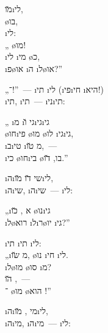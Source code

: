  \u{מו}\i{לי},\\
 \o{בו},\\
  \i{לי}:\\
„ \o{מו}!\\
  \i{לי} \i{מי}  \o{כ},\\
  \i{פ}\o{או} \i{ה} \i{ל}\o{או}?”

„־!”~— \i{תי} \i{לי} (\i{פי}\i{חי} \i{היא}!)\\
\i{תי}, \i{תי}~—  \i{ני}\i{תי}:

„  \i{מ} \i{גי} \u{ו}\i{גי}\i{גי}\\
\o{חו}\i{פי} \o{מו} \o{לו} \i{גי}\i{גי},\\
 \i{ב}\i{טי}  \i{מ} \u{טו},~—\\
\i{כי}  \o{חו}\i{בי} \o{בו}, \u{דו}.”

 \i{ה}\i{שי} \u{דו} \u{מו}\i{לי},\\
\i{ה}\i{שי}, \i{ה}\i{שי}~—   \i{לי}:

„\i{א} ,   \u{כו} \o{נו}\i{גי}\\
\i{ל}\o{רוא} \i{ל}\i{ר}\o{יו}  \i{גי}?”

\i{תי}  \i{תי} \i{לי}:\\
„\i{מ}  \u{שו}, \o{נו} \i{חי} \i{לי}.\\
   \i{ל}\o{מו}  \o{סו} \i{מ}?\\
 \u{הו} ,~—\\
־ \o{מו} \o{הוא} !”

 \i{ה}\i{מי} , \u{מו}\i{לי},\\
\i{ה}\i{מי}, \i{ה}\i{מי}~—   \i{לי}:

